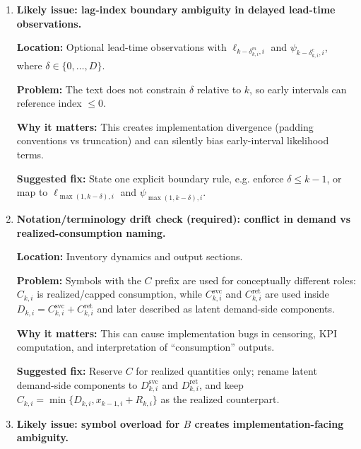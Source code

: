 \documentclass[11pt]{article}
\begin{document}
\begin{enumerate}
  \textbf{Suggested fix:} Add a compact ``initial latent-state priors'' block, e.g.
  $\log\lambda_{1,j}\sim\text{Normal}(m_{\lambda,j},s_{\lambda,j}^2)$,
  $\log\mu_{1,i}\sim\text{Normal}(m_{\mu,i},s_{\mu,i}^2)$,
  $\ell_{1,i}\sim\text{Normal}(m_{L,i},s_{L,i}^2)$,
  $\psi_{1,i}\sim\text{Normal}(m_{v,i},s_{v,i}^2)$,
  and (if used) $\mu^{\mathrm{use}}_{1,j,i}\sim\text{Normal}(m_{\mathrm{use},j,i},s_{\mathrm{use},j,i}^2)$.

  \item \textbf{Likely issue: lag-index boundary ambiguity in delayed lead-time observations.}

  \textbf{Location:} Optional lead-time observations with
  $\ell_{k-\delta^m_{k,i},i}$ and $\psi_{k-\delta^c_{k,i},i}$, where $\delta\in\{0,\dots,D\}$.

  \textbf{Problem:} The text does not constrain $\delta$ relative to $k$, so early intervals can reference index $\le 0$.

  \textbf{Why it matters:} This creates implementation divergence (padding conventions vs truncation) and can silently bias early-interval likelihood terms.

  \textbf{Suggested fix:} State one explicit boundary rule, e.g. enforce $\delta\le k-1$, or map to
  $\ell_{\max(1,k-\delta),i}$ and $\psi_{\max(1,k-\delta),i}$.

  \item \textbf{Notation/terminology drift check (required): conflict in demand vs realized-consumption naming.}

  \textbf{Location:} Inventory dynamics and output sections.

  \textbf{Problem:} Symbols with the $C$ prefix are used for conceptually different roles:
  $C_{k,i}$ is realized/capped consumption, while $C^{\mathrm{svc}}_{k,i}$ and $C^{\mathrm{ret}}_{k,i}$ are used inside
  $D_{k,i}=C^{\mathrm{svc}}_{k,i}+C^{\mathrm{ret}}_{k,i}$ and later described as latent demand-side components.

  \textbf{Why it matters:} This can cause implementation bugs in censoring, KPI computation, and interpretation of ``consumption'' outputs.

  \textbf{Suggested fix:} Reserve $C$ for realized quantities only; rename latent demand-side components to
  $D^{\mathrm{svc}}_{k,i}$ and $D^{\mathrm{ret}}_{k,i}$, and keep
  $C_{k,i}=\min\{D_{k,i},x_{k-1,i}+R_{k,i}\}$ as the realized counterpart.

  \item \textbf{Likely issue: symbol overload for $B$ creates implementation-facing ambiguity.}


\end{enumerate}
\end{document}
